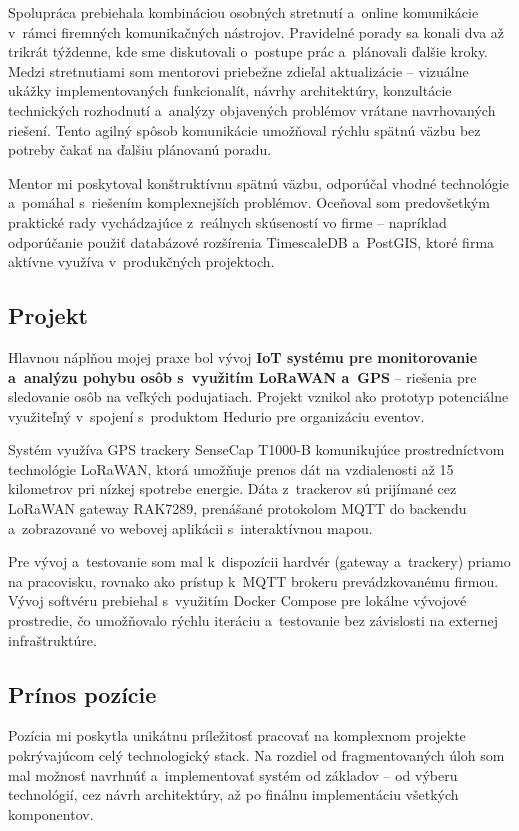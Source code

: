 Spolupráca prebiehala kombináciou osobných stretnutí a~online komunikácie v~rámci firemných komunikačných nástrojov. Pravidelné porady sa konali dva až trikrát týždenne, kde sme diskutovali o~postupe prác a~plánovali ďalšie kroky. Medzi stretnutiami som mentorovi priebežne zdieľal aktualizácie -- vizuálne ukážky implementovaných funkcionalít, návrhy architektúry, konzultácie technických rozhodnutí a~analýzy objavených problémov vrátane navrhovaných riešení. Tento agilný spôsob komunikácie umožňoval rýchlu spätnú väzbu bez potreby čakať na ďalšiu plánovanú poradu.

Mentor mi poskytoval konštruktívnu spätnú väzbu, odporúčal vhodné technológie a~pomáhal s~riešením komplexnejších problémov. Oceňoval som predovšetkým praktické rady vychádzajúce z~reálnych skúseností vo firme -- napríklad odporúčanie použiť databázové rozšírenia TimescaleDB a~PostGIS, ktoré firma aktívne využíva v~produkčných projektoch.

\subsection{Projekt}
\label{sec:Projekt}

Hlavnou náplňou mojej praxe bol vývoj \textbf{IoT systému pre monitorovanie a~analýzu pohybu osôb s~využitím LoRaWAN a~GPS} -- riešenia pre sledovanie osôb na veľkých podujatiach. Projekt vznikol ako prototyp potenciálne využiteľný v~spojení s~produktom Hedurio pre organizáciu eventov.

Systém využíva GPS trackery SenseCap T1000-B komunikujúce prostredníctvom technológie LoRaWAN, ktorá umožňuje prenos dát na vzdialenosti až 15 kilometrov pri nízkej spotrebe energie. Dáta z~trackerov sú prijímané cez LoRaWAN gateway RAK7289, prenášané protokolom MQTT do backendu a~zobrazované vo webovej aplikácii s~interaktívnou mapou.

Pre vývoj a~testovanie som mal k~dispozícii hardvér (gateway a~trackery) priamo na pracovisku, rovnako ako prístup k~MQTT brokeru prevádzkovanému firmou. Vývoj softvéru prebiehal s~využitím Docker Compose pre lokálne vývojové prostredie, čo umožňovalo rýchlu iteráciu a~testovanie bez závislosti na externej infraštruktúre.

\subsection{Prínos pozície}
\label{sec:PrinosPozice}

Pozícia mi poskytla unikátnu príležitosť pracovať na komplexnom projekte pokrývajúcom celý technologický stack. Na rozdiel od fragmentovaných úloh som mal možnosť navrhnúť a~implementovať systém od základov -- od výberu technológií, cez návrh architektúry, až po finálnu implementáciu všetkých komponentov.

